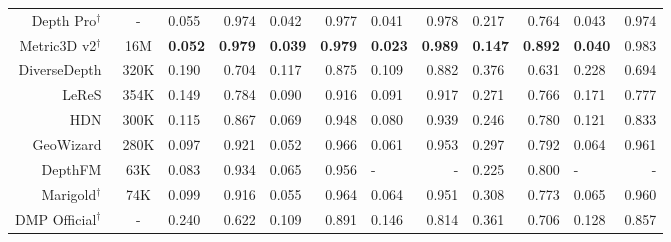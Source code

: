 \begin{table*}[htbp]
{\begin{tabular}{@{}r|c|lr|lr|lr|lr|lr@{}}
    Depth Pro$^\dagger$~\cite{bochkovskii2024depth}  & -	& 0.055  & 0.974
     		& 0.042	& 0.977
                & 0.041  & 0.978
     		& 0.217	& 0.764
                & 0.043  & 0.974
     		\\

    Metric3D v2$^\dagger$~\cite{hu2024metric3d}   & 16M	& \textbf{0.052}  & \textbf{0.979}
     		& \textbf{0.039}	& \textbf{0.979}
                & \textbf{0.023}  & \textbf{0.989}
     		& \textbf{0.147}	& \textbf{0.892}
                & \textbf{0.040}  & 0.983
     		\\
    

    DiverseDepth~\cite{diversedepth}  & 320K 	& 0.190  & 0.704
     		& 0.117	& 0.875
                & 0.109 & 0.882
     		& 0.376	& 0.631
                & 0.228 & 0.694
     		\\
       
    LeReS~\cite{leres}  & 354K	    & 0.149  & 0.784
     		& 0.090	& 0.916
                & 0.091 & 0.917
     		& 0.271	& 0.766
                & 0.171 & 0.777
     		\\
       
    HDN~\cite{hdn}  & 300K	    & 0.115  & 0.867
     		& 0.069	& 0.948
                & 0.080 & 0.939
     		& 0.246	& 0.780
                & 0.121  & 0.833
     		\\

    GeoWizard~\cite{fu2024geowizard}  & 280K & 0.097  & 0.921
     		& 0.052	& 0.966
                & 0.061 & 0.953
     		& 0.297	& 0.792
                & 0.064  & 0.961
     		\\

    DepthFM~\cite{gui2024depthfm}  & 63K	& 0.083  & 0.934
     		& 0.065	& 0.956
                &  - & -
     		& 0.225 & 0.800
                & -  & -
     		\\
            

    Marigold$^\dagger$~\cite{ke2024repurposing}  & 74K	& 0.099  & 0.916
     		& 0.055	& 0.964
                & 0.064  & 0.951
     		& 0.308	& 0.773
                & 0.065  & 0.960
     		\\

    DMP Official$^\dagger$~\cite{lee2024exploiting}  & -  & 0.240  & 0.622
     		& 0.109	& 0.891
                & 0.146    & 0.814
     		& 0.361 	& 0.706
                & 0.128    &  0.857
     		\\


\end{tabular}}
\end{table*}
